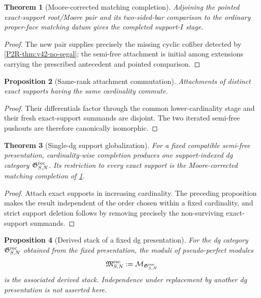 \documentclass[11pt]{article}
\newtheorem{theorem}{Theorem}[section]
\newtheorem{proposition}[theorem]{Proposition}
\theoremstyle{remark}
\begin{document}
\begin{theorem}[Moore-corrected matching completion]
\label{P2R-thm:v42-moore-matching-completion}
Adjoining the pointed exact-support root/Moore pair and its two-sided-bar
comparison to the ordinary proper-face matching datum gives the completed
support-\(I\) stage.
\end{theorem}

\begin{proof}
The new pair supplies precisely the missing cyclic cofiber detected by
\cref{P2R-thm:v42-no-segal}; the semi-free attachment is initial among
extensions carrying the prescribed antecedent and pointed comparison.
\end{proof}

\begin{proposition}[Same-rank attachment commutation]
\label{P2R-prop:v42-same-rank-commute}
Attachments of distinct exact supports having the same cardinality commute.
\end{proposition}

\begin{proof}
Their differentials factor through the common lower-cardinality stage and
their fresh exact-support summands are disjoint.  The two iterated semi-free
pushouts are therefore canonically isomorphic.
\end{proof}

\begin{theorem}[Single-dg support globalization]
\label{P2R-thm:v42-single-dg-globalization}
For a fixed compatible semi-free presentation, cardinality-wise completion
produces one support-indexed dg category
\(\mathfrak G^{\rm rec}_{S,N}\).  Its restriction to every exact support is
the Moore-corrected matching completion of
\cref{P2R-thm:v42-moore-matching-completion}.
\end{theorem}

\begin{proof}
Attach exact supports in increasing cardinality.  The preceding proposition
makes the result independent of the order chosen within a fixed cardinality,
and strict support deletion follows by removing precisely the non-surviving
exact-support summands.
\end{proof}

\begin{proposition}[Derived stack of a fixed dg presentation]
\label{P2R-thm:v42-stack-globalization}
For the dg category \(\mathfrak G^{\rm rec}_{S,N}\) obtained from the fixed
presentation, the moduli of pseudo-perfect modules
\[
 \mathfrak M^{\rm rec}_{S,N}
 :=\mathcal M_{\mathfrak G^{\rm rec}_{S,N}}
\]
is the associated derived stack.  Independence under replacement by another
dg presentation is not asserted here.
\end{proposition}
\end{document}
